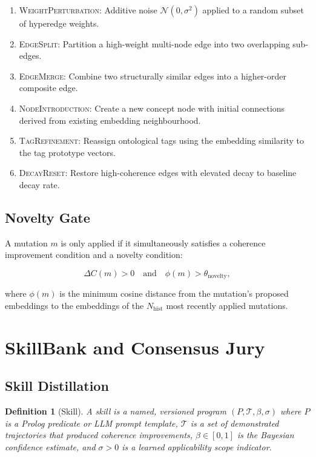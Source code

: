 \documentclass[11pt]{article}
\newtheorem{definition}{Definition}
\begin{document}
\begin{enumerate}[noitemsep,topsep=4pt]
  \item \textsc{WeightPerturbation}: Additive noise $\mathcal{N}(0, \sigma^2)$
        applied to a random subset of hyperedge weights.
  \item \textsc{EdgeSplit}: Partition a high-weight multi-node edge into two
        overlapping sub-edges.
  \item \textsc{EdgeMerge}: Combine two structurally similar edges into a
        higher-order composite edge.
  \item \textsc{NodeIntroduction}: Create a new concept node with initial
        connections derived from existing embedding neighbourhood.
  \item \textsc{TagRefinement}: Reassign ontological tags using the embedding
        similarity to the tag prototype vectors.
  \item \textsc{DecayReset}: Restore high-coherence edges with elevated decay
        to baseline decay rate.
\end{enumerate}

\subsection{Novelty Gate}

A mutation $m$ is only applied if it simultaneously satisfies a coherence
improvement condition and a novelty condition:

\begin{equation}
  \Delta C(m) > 0 \quad \text{and} \quad \phi(m) > \theta_{\text{novelty}},
\end{equation}

where $\phi(m)$ is the minimum cosine distance from the mutation's proposed
embeddings to the embeddings of the $N_{\text{hist}}$ most recently applied
mutations.

\section{SkillBank and Consensus Jury}
\label{sec:skills}

\subsection{Skill Distillation}

\begin{definition}[Skill]
A \emph{skill} is a named, versioned program $(P, \mathcal{T}, \beta, \sigma)$
where $P$ is a Prolog predicate or LLM prompt template, $\mathcal{T}$ is a
set of demonstrated trajectories that produced coherence improvements,
$\beta \in [0,1]$ is the Bayesian confidence estimate, and $\sigma > 0$ is a
learned applicability scope indicator.
\end{definition}
\end{document}
